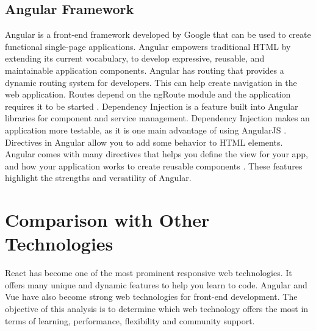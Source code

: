 \documentclass[10pt,journal,compsoc]{IEEEtran}
\begin{document}
\subsection{Angular Framework}
Angular is a front-end framework developed by Google that can be used to create functional single-page applications. Angular empowers traditional HTML by extending its current vocabulary, to develop expressive, reusable, and maintainable application components\cite{branas2014angularjs}. Angular has routing that provides a dynamic routing system for developers. This can help create navigation in the web application. Routes depend on the ngRoute module and the application requires it to be started \cite{williamson2015learning}. Dependency Injection is a feature built into Angular libraries for component and service management. Dependency Injection makes an application more testable, as it is one main advantage of using AngularJS \cite{williamson2015learning}. Directives in Angular allow you to add some behavior to HTML elements. Angular comes with many directives that helps you define the view for your app, and how your application works to create reusable components \cite{green2013angularjs}. These features highlight the strengths and versatility of Angular. 


\section{Comparison with Other Technologies}
React has become one of the most prominent responsive web technologies. It offers many unique and dynamic features to help you learn to code. Angular and Vue have also become strong web technologies for front-end development. The objective of this analysis is to determine which web technology offers the most in terms of learning, performance, flexibility and community support. 
\end{document}

